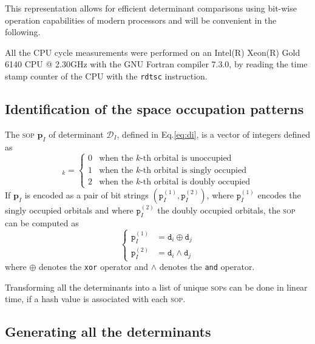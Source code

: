 \documentclass[aip,jcp,reprint,showkeys]{revtex4-1}
\newcommand{\md}{\mathtt{d}}
\newcommand{\mD}{\mathcal{D}}
\newcommand{\mpp}{\mathtt{p}}
\newcommand{\mpv}{\mathbf{p}}
\newcommand{\sop}{\textsc{sop}}
\begin{document}
This representation allows for efficient determinant comparisons using bit-wise operation 
capabilities of modern processors\cite{Scemama_2013} and will be convenient in the following.

All the CPU cycle measurements were performed on an Intel(R) Xeon(R)
Gold 6140 CPU @ 2.30GHz with the GNU Fortran compiler 7.3.0, by reading
the time stamp counter of the CPU with the \texttt{rdtsc} instruction.


\subsection{Identification of the space occupation patterns}

The {\sop} $\mpv_I$ of determinant $\mD_I$, 
defined in Eq.\eqref{eq:di},
is a vector of integers defined as
\begin{equation}
  [\mpv_I]_k = 
  \begin{cases} 
    0 & \text{when the $k$-th orbital is unoccupied} \\
    1 & \text{when the $k$-th orbital is singly occupied} \\
    2 & \text{when the $k$-th orbital is doubly occupied}
  \end{cases} 
\end{equation}
If $\mpv_I$ is encoded as a pair of bit strings $(\mpp_I^{(1)}, \mpp_I^{(2)})$, where
$\mpp_I^{(1)}$ encodes the singly occupied orbitals and where $\mpp_I^{(2)}$ the doubly
occupied orbitals, the {\sop} can be computed as
\begin{equation}
\label{eq:sop}
\begin{cases}
  \mpp_I^{(1)} & = \md_i \oplus \md_j \\
  \mpp_I^{(2)} & = \md_i \wedge \md_j 
  \end{cases} 
\end{equation}
where $\oplus$ denotes the \texttt{xor} operator and $\wedge$ denotes the
\texttt{and} operator.

Transforming all the determinants into a list of unique \sop s can be done
in linear time, if a hash value is associated with each \sop .\cite{Bitton_1983}


\subsection{Generating all the determinants}
\end{document}
